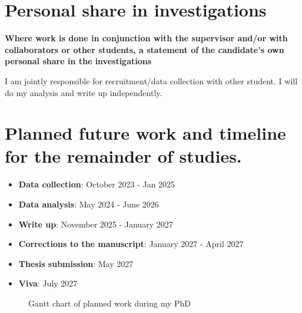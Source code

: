 \documentclass[
  letterpaper,
  DIV=11,
  numbers=noendperiod]{scrartcl}
\providecommand{\tightlist}{%
  \setlength{\itemsep}{0pt}\setlength{\parskip}{0pt}}\usepackage{longtable,booktabs,array}
\begin{document}
\section{Personal share in
investigations}\label{personal-share-in-investigations}

\textbf{Where work is done in conjunction with the supervisor and/or
with collaborators or other students, a statement of the candidate's own
personal share in the investigations}

I am jointly responsible for recruitment/data collection with other
student. I will do my analysis and write up independently.

\section{Planned future work and timeline for the remainder of
studies.}\label{planned-future-work-and-timeline-for-the-remainder-of-studies.}

\begin{itemize}
\tightlist
\item
  \textbf{Data collection}: October 2023 - Jan 2025
\item
  \textbf{Data analysis}: May 2024 - June 2026
\item
  \textbf{Write up}: November 2025 - January 2027
\item
  \textbf{Corrections to the manuscript}: January 2027 - April 2027
\item
  \textbf{Thesis submission}: May 2027
\item
  \textbf{Viva}: July 2027
\end{itemize}

\begin{figure}[H]


\caption{\label{fig-gantt-chart}Gantt chart of planned work during my
PhD}

\end{figure}%
\end{document}
